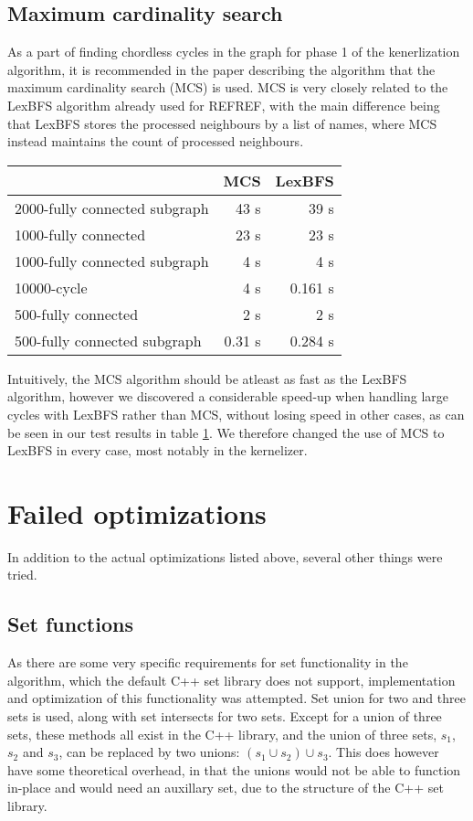 \documentclass{article}
\begin{document}
		\subsection{Maximum cardinality search}
		\label{subsec:maximum-cardinality-search}
		As a part of finding chordless cycles in the graph for phase 1 of the kenerlization algorithm, it is recommended in the paper describing the algorithm\cite{kernel} that the maximum cardinality search (MCS) is used.
		MCS is very closely related to the LexBFS algorithm already used for REFREF, with the main difference being that LexBFS stores the processed neighbours by a list of names, where MCS instead maintains the count of processed neighbours.

		\begin{table}[!ht]
			\begin{tabular}{| l | r | r |}
			\hline
											& MCS 		& LexBFS 	\\ \hline
			2000-fully connected subgraph	& 43 s  	& 39 s 		\\ \hline
			1000-fully connected 			& 23 s 		& 23 s 		\\ \hline
			1000-fully connected subgraph	& 4 s   	& 4 s 		\\ \hline
			10000-cycle 					& 4 s   	& 0.161 s 	\\ \hline 
			500-fully connected 			& 2 s   	& 2 s 		\\ \hline 
			500-fully connected subgraph 	& 0.31 s 	& 0.284 s 	\\ \hline 
			\end{tabular}
			\label{table:maximum-cardinality-search}
		\end{table}
		Intuitively, the MCS algorithm should be atleast as fast as the LexBFS algorithm, however we discovered a considerable speed-up when handling large cycles with LexBFS rather than MCS, without losing speed in other cases, as can be seen in our test results in table \ref{table:maximum-cardinality-search}.
		We therefore changed the use of MCS to LexBFS in every case, most notably in the kernelizer.

	\section{Failed optimizations}
	In addition to the actual optimizations listed above, several other things were tried.

		\subsection{Set functions}
		As there are some very specific requirements for set functionality in the algorithm, which the default C++ set library does not support, implementation and optimization of this functionality was attempted.
		Set union for two and three sets is used, along with set intersects for two sets.
		Except for a union of three sets, these methods all exist in the C++ library, and the union of three sets, $s_1$, $s_2$ and $s_3$, can be replaced by two unions: $(s_1 \cup s_2) \cup s_3$.
		This does however have some theoretical overhead, in that the unions would not be able to function in-place and would need an auxillary set, due to the structure of the C++ set library.
\end{document}
